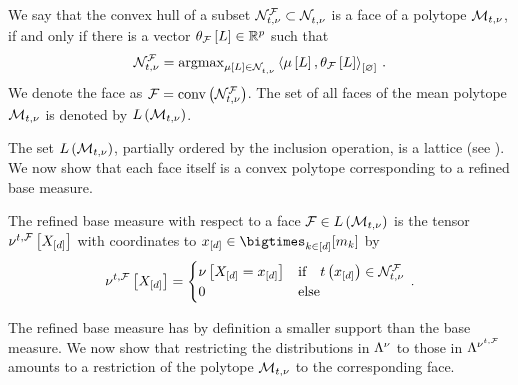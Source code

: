 \begin{definition}
    We say that the convex hull of a subset $\mathcal{N}_{t,\nu}^{\mathcal{F}}\subset\mathcal{N}_{t,\nu}^{}$ is a face of a polytope $\mathcal{M}_{t,\nu}$, if and only if there is a vector $\theta_{\mathcal{F}}\left[L\right]\in\mathbb{R}^{p}$ such that
    \begin{align*}
        \mathcal{N}_{t,\nu}^{\mathcal{F}}
        = \mathrm{argmax}_{\mu\left[L\right]\in\mathcal{N}_{t,\nu}^{}} \left\langle \mu\left[L\right],\theta_{\mathcal{F}}\left[L\right]\right\rangle_{\left[ \varnothing \right]} \, .
    \end{align*}
    We denote the face as $\mathcal{F}=\mathrm{conv}\left(\mathcal{N}_{t,\nu}^{\mathcal{F}}\right)$.
    The set of all faces of the mean polytope $\mathcal{M}_{t,\nu}$ is denoted by $L\left(\mathcal{M}_{t,\nu}\right)$.
\end{definition}

The set $L\left(\mathcal{M}_{t,\nu}\right)$, partially ordered by the inclusion operation, is a lattice (see \cite{ziegler_lectures_2013}).
We now show that each face itself is a convex polytope corresponding to a refined base measure.

\begin{definition}
    \label{def:faceMeasure}
    The refined base measure with respect to a face $\mathcal{F}\in L\left(\mathcal{M}_{t,\nu}\right)$ is the tensor $\nu^{t,\mathcal{F}}\left[X_{[d]}\right]$ with coordinates to $\shortcatindicesin$ by
    \begin{align*}
        \nu^{t,\mathcal{F}}\left[X_{[d]}\right]
        = \begin{cases}
              \nu\left[X_{[d]}=x_{[d]}\right] & \text{if}\quad t\left(x_{[d]}\right)\in\mathcal{N}_{t,\nu}^{\mathcal{F}} \\
              0 & \text{else}
        \end{cases} \, .
    \end{align*}
\end{definition}

The refined base measure has by definition a smaller support than the base measure.
We now show that restricting the distributions in $\Lambda^{\nu}$ to those in $\Lambda^{\nu^{t,\mathcal{F}}}$ amounts to a restriction of the polytope $\mathcal{M}_{t,\nu}$ to the corresponding face.


